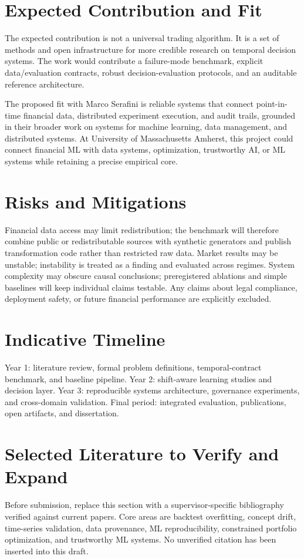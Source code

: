\documentclass[11pt]{article}
\begin{document}
\section*{Expected Contribution and Fit}
The expected contribution is not a universal trading algorithm. It is a set of methods and open infrastructure for more credible research on temporal decision systems. The work would contribute a failure-mode benchmark, explicit data/evaluation contracts, robust decision-evaluation protocols, and an auditable reference architecture.

The proposed fit with Marco Serafini is reliable systems that connect point-in-time financial data, distributed experiment execution, and audit trails, grounded in their broader work on systems for machine learning, data management, and distributed systems. At University of Massachusetts Amherst, this project could connect financial ML with data systems, optimization, trustworthy AI, or ML systems while retaining a precise empirical core.

\section*{Risks and Mitigations}
Financial data access may limit redistribution; the benchmark will therefore combine public or redistributable sources with synthetic generators and publish transformation code rather than restricted raw data. Market results may be unstable; instability is treated as a finding and evaluated across regimes. System complexity may obscure causal conclusions; preregistered ablations and simple baselines will keep individual claims testable. Any claims about legal compliance, deployment safety, or future financial performance are explicitly excluded.

\section*{Indicative Timeline}
Year 1: literature review, formal problem definitions, temporal-contract benchmark, and baseline pipeline. Year 2: shift-aware learning studies and decision layer. Year 3: reproducible systems architecture, governance experiments, and cross-domain validation. Final period: integrated evaluation, publications, open artifacts, and dissertation.

\section*{Selected Literature to Verify and Expand}
Before submission, replace this section with a supervisor-specific bibliography verified against current papers. Core areas are backtest overfitting, concept drift, time-series validation, data provenance, ML reproducibility, constrained portfolio optimization, and trustworthy ML systems. No unverified citation has been inserted into this draft.
\end{document}
